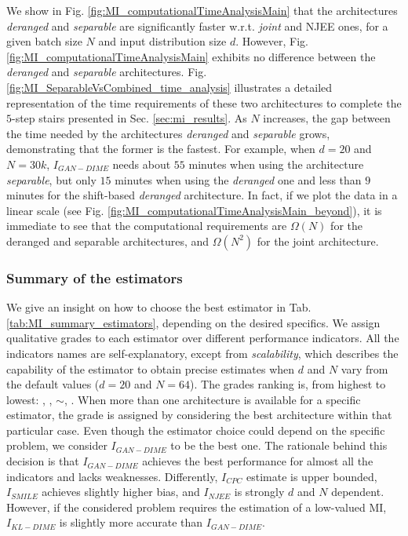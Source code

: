 We show in Fig. \ref{fig:MI_computationalTimeAnalysisMain} that the architectures \textit{deranged} and \textit{separable} are significantly faster w.r.t. \textit{joint} and NJEE ones, for a given batch size $N$ and input distribution size $d$.
However, Fig. \ref{fig:MI_computationalTimeAnalysisMain} exhibits no difference between the \textit{deranged} and \textit{separable} architectures. 
Fig. \ref{fig:MI_SeparableVsCombined_time_analysis} illustrates a detailed representation of the time requirements of these two architectures to complete the $5$-step stairs presented in Sec. \ref{sec:mi_results}.
As $N$ increases, the gap between the time needed by the architectures \textit{deranged} and \textit{separable} grows, demonstrating that the former is the fastest. For example, when $d=20$ and $N=30k$, $I_{GAN-DIME}$ needs about $55$ minutes when using the architecture \textit{separable}, but only $15$ minutes when using the \textit{deranged} one and less than $9$ minutes for the shift-based \textit{deranged} architecture.
In fact, if we plot the data in a linear scale (see Fig. \ref{fig:MI_computationalTimeAnalysisMain_beyond}), it is immediate to see that the computational requirements are $\Omega(N)$ for the deranged and separable architectures, and $\Omega(N^2)$ for the joint architecture. 

\subsubsection{Summary of the estimators}
\label{subsubsec:mi_appendix_final_considerations}

We give an insight on how to choose the best estimator in Tab. \ref{tab:MI_summary_estimators}, depending on the desired specifics. We assign qualitative grades to each estimator over different performance indicators.
All the indicators names are self-explanatory, except from \textit{scalability}, which describes the capability of the estimator to obtain precise estimates when $d$ and $N$ vary from the default values ($d=20$ and $N=64$). The grades ranking is, from highest to lowest: \cmark\cmark, \cmark, $\sim$, \xmark. When more than one architecture is available for a specific estimator, the grade is assigned by considering the best architecture within that particular case.
Even though the estimator choice could depend on the specific problem, we consider $I_{GAN-DIME}$ to be the best one. The rationale behind this decision is that $I_{GAN-DIME}$ achieves the best performance for almost all the indicators and lacks weaknesses. Differently, $I_{CPC}$ estimate is upper bounded, $I_{SMILE}$ achieves slightly higher bias, and $I_{NJEE}$ is strongly $d$ and $N$ dependent. However, if the considered problem requires the estimation of a low-valued MI, $I_{KL-DIME}$ is slightly more accurate than $I_{GAN-DIME}$.  

